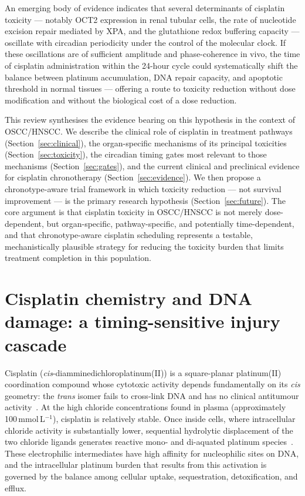 \documentclass[preprint,review,12pt]{elsarticle}
\begin{document}
An emerging body of evidence indicates that several determinants of
cisplatin toxicity --- notably OCT2 expression in renal tubular cells,
the rate of nucleotide excision repair mediated by XPA, and the
glutathione redox buffering capacity --- oscillate with circadian periodicity
under the control of the molecular clock.  If these oscillations are of
sufficient amplitude and phase-coherence in vivo, the time of cisplatin
administration within the 24-hour cycle could systematically shift the
balance between platinum accumulation, DNA repair capacity, and apoptotic
threshold in normal tissues --- offering a route to toxicity reduction without
dose modification and without the biological cost of a dose reduction.

This review synthesises the evidence bearing on this hypothesis in the
context of OSCC/HNSCC.  We describe the clinical role of cisplatin in
treatment pathways (Section~\ref{sec:clinical}), the organ-specific
mechanisms of its principal toxicities (Section~\ref{sec:toxicity}),
the circadian timing gates most relevant to those mechanisms
(Section~\ref{sec:gates}), and the current clinical and preclinical
evidence for cisplatin chronotherapy (Section~\ref{sec:evidence}).
We then propose a chronotype-aware trial framework in which toxicity
reduction --- not survival improvement --- is the primary research hypothesis
(Section~\ref{sec:future}).  The core argument is that cisplatin toxicity
in OSCC/HNSCC is not merely dose-dependent, but organ-specific,
pathway-specific, and potentially time-dependent, and that
chronotype-aware cisplatin scheduling represents a testable,
mechanistically plausible strategy for reducing the toxicity burden
that limits treatment completion in this population.


\section{Cisplatin chemistry and DNA damage: a timing-sensitive injury cascade}
\label{sec:mechanism}


Cisplatin (\emph{cis}-diamminedichloroplatinum(II)) is a square-planar
platinum(II) coordination compound whose cytotoxic activity depends
fundamentally on its \emph{cis} geometry: the \emph{trans} isomer fails to
cross-link DNA and has no clinical antitumour activity~\cite{Kelland2007}.
At the high chloride concentrations found in plasma (approximately
100\,mmol\,L$^{-1}$), cisplatin is relatively stable. Once inside cells, where
intracellular chloride activity is substantially lower, sequential hydrolytic
displacement of the two chloride ligands generates reactive mono- and
di-aquated platinum species~\cite{Pabla2008}. These electrophilic intermediates
have high affinity for nucleophilic sites on DNA, and the intracellular
platinum burden that results from this activation is governed by the balance
among cellular uptake, sequestration, detoxification, and efflux.
\end{document}
